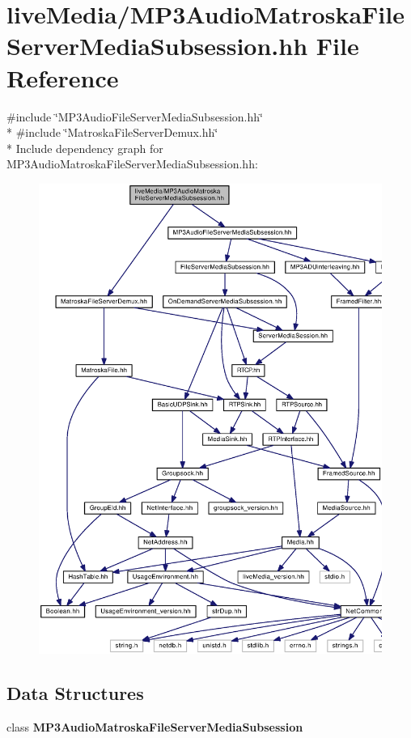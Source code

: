 \section{live\+Media/\+M\+P3\+Audio\+Matroska\+File\+Server\+Media\+Subsession.hh File Reference}
\label{MP3AudioMatroskaFileServerMediaSubsession_8hh}
{\ttfamily \#include \char`\"{}M\+P3\+Audio\+File\+Server\+Media\+Subsession.\+hh\char`\"{}}\\*
{\ttfamily \#include \char`\"{}Matroska\+File\+Server\+Demux.\+hh\char`\"{}}\\*
Include dependency graph for M\+P3\+Audio\+Matroska\+File\+Server\+Media\+Subsession.\+hh\+:
\nopagebreak
\begin{figure}[H]
\begin{center}
\leavevmode
\includegraphics[width=350pt]{MP3AudioMatroskaFileServerMediaSubsession_8hh__incl}
\end{center}
\end{figure}
\subsection*{Data Structures}
\begin{DoxyCompactItemize}
\item 
class {\bf M\+P3\+Audio\+Matroska\+File\+Server\+Media\+Subsession}
\end{DoxyCompactItemize}
